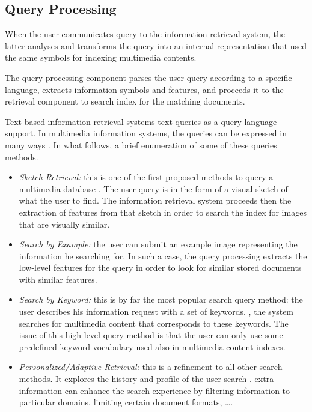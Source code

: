 		\subsection{Query Processing}

		When the user communicates query to the information retrieval system, the latter analyses and 
		transforms the query into an internal representation that used the same symbols for indexing
		multimedia contents. 

		The query processing component parses the user query according to a specific language,
		extracts information symbols and features, and proceeds it to the retrieval component 
		to search index for the matching documents.
		
		Text based information retrieval systems  text queries as a query language support. 
		In multimedia information systems, the queries can be expressed in many ways \citep{Liu2007,Yasmin2014}. 
		In what follows, a brief enumeration of some of these queries methods.
		
		\begin{itemize}
			\item \textit{Sketch Retrieval:} this is one of the first proposed methods to query 
			a multimedia database \citep{Cao2010,Cao2011}. The user query is in the form of a visual
			sketch of what the user  to find. The information retrieval system proceeds then the 
			extraction of features from that sketch in order to search the index for images that are 
			visually similar.
			
			\item \textit{Search by Example:} the user can submit an example image representing the 
			information he  searching for. In such a case, the query processing extracts the low-level 
			features for the query in order to look for similar stored documents with similar features.
			
			\item \textit{Search by Keyword:} this is by far the most popular search query method: 
			the user describes his information request with a set of keywords. , the system
			searches for multimedia content that corresponds to these keywords. The issue of this 
			high-level query method is that the user can only use some predefined keyword vocabulary 
			used also in multimedia content indexes.
			
			\item \textit{Personalized/Adaptive Retrieval:} this is a refinement to all other search methods. 
			It explores the history and profile of the user search \citep{Magalhaes2004}. 
			 extra-information can enhance the search experience by filtering information
			to particular domains, limiting certain document formats, \dots{}.

		\end{itemize}

